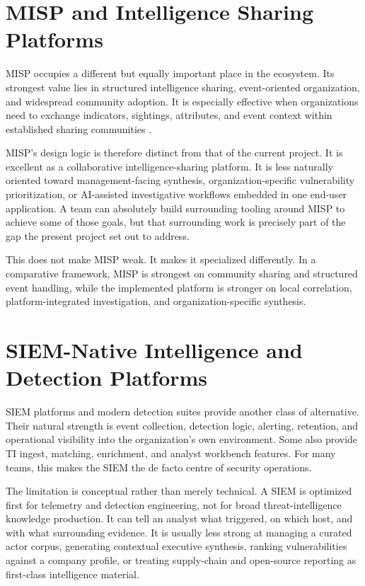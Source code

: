 \section{MISP and Intelligence Sharing Platforms}
MISP occupies a different but equally important place in the ecosystem. Its strongest value lies in structured intelligence sharing, event-oriented organization, and widespread community adoption. It is especially effective when organizations need to exchange indicators, sightings, attributes, and event context within established sharing communities \cite{misp_project}.

MISP's design logic is therefore distinct from that of the current project. It is excellent as a collaborative intelligence-sharing platform. It is less naturally oriented toward management-facing synthesis, organization-specific vulnerability prioritization, or AI-assisted investigative workflows embedded in one end-user application. A team can absolutely build surrounding tooling around MISP to achieve some of those goals, but that surrounding work is precisely part of the gap the present project set out to address.

This does not make MISP weak. It makes it specialized differently. In a comparative framework, MISP is strongest on community sharing and structured event handling, while the implemented platform is stronger on local correlation, platform-integrated investigation, and organization-specific synthesis.

\section{SIEM-Native Intelligence and Detection Platforms}
SIEM platforms and modern detection suites provide another class of alternative. Their natural strength is event collection, detection logic, alerting, retention, and operational visibility into the organization's own environment. Some also provide TI ingest, matching, enrichment, and analyst workbench features. For many teams, this makes the SIEM the de facto centre of security operations.

The limitation is conceptual rather than merely technical. A SIEM is optimized first for telemetry and detection engineering, not for broad threat-intelligence knowledge production. It can tell an analyst what triggered, on which host, and with what surrounding evidence. It is usually less strong at managing a curated actor corpus, generating contextual executive synthesis, ranking vulnerabilities against a company profile, or treating supply-chain and open-source reporting as first-class intelligence material.

